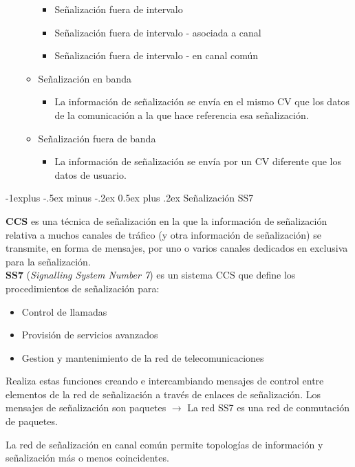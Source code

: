 \documentclass[10pt,portrait, twocolumn]{article}
\makeatletter
\renewcommand{\subsection}{\@startsection{subsection}{2}{0mm}%
                                {-1explus -.5ex minus -.2ex}%
                                {0.5ex plus .2ex}%
                                {\normalfont\normalsize\bfseries}}
\makeatother
\begin{document}
\begin{itemize}
\begin{itemize}
\begin{itemize}
			\item Señalización fuera de intervalo
			\item Señalización fuera de intervalo - asociada a canal
			\item Señalización fuera de intervalo - en canal común
			\end{itemize}
		\item Señalización en banda
			\begin{itemize}
			\item La información de señalización se envía en el mismo CV que los datos de la comunicación a la que hace referencia esa señalización.
			\end{itemize}
		\item Señalización fuera de banda
			\begin{itemize}
			\item La información de señalización se envía por un CV diferente que los datos de usuario.
			\end{itemize}
	\end{itemize}
\end{itemize}

\subsection{Señalización SS7}

\textbf{CCS} es una técnica de señalización en la que la información de señalización relativa a muchos canales de tráfico (y otra información de señalización) se transmite, en forma de mensajes, por uno o varios canales dedicados en exclusiva para la señalización.\\

\textbf{SS7} (\textit{Signalling System Number 7}) es un sistema CCS que define los procedimientos de señalización  para:
	\begin{itemize}
	\item Control de llamadas
	\item Provisión de servicios avanzados
	\item Gestion y mantenimiento de la red de telecomunicaciones
	\end{itemize}
	
Realiza estas funciones creando e intercambiando mensajes de control entre elementos de la red de señalización a través de enlaces de señalización. Los mensajes de señalización son paquetes $\rightarrow$ La red SS7 es una red de conmutación de paquetes.

	\quad La red de señalización en canal común permite topologías de información y señalización más o menos coincidentes.
	
\end{document}
